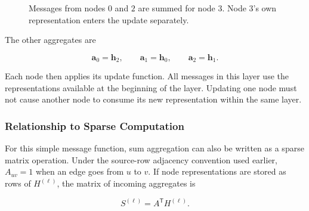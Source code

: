 \begin{figure}[H]
  \centering
  \caption{Messages from nodes $0$ and $2$ are summed for node $3$. Node $3$'s own representation enters the update separately.}
  \label{fig:message-passing-example}
\end{figure}

The other aggregates are

\[
  \mathbf{a}_0=\mathbf{h}_2,
  \qquad
  \mathbf{a}_1=\mathbf{h}_0,
  \qquad
  \mathbf{a}_2=\mathbf{h}_1.
\]

Each node then applies its update function. All messages in this layer use the representations available at the beginning of the layer. Updating one node must not cause another node to consume its new representation within the same layer.

\subsubsection{Relationship to Sparse Computation}

For this simple message function, sum aggregation can also be written as a sparse matrix operation. Under the source-row adjacency convention used earlier, $A_{uv}=1$ when an edge goes from $u$ to $v$. If node representations are stored as rows of $H^{(\ell)}$, the matrix of incoming aggregates is

\[
  S^{(\ell)}=A^{\mathsf{T}}H^{(\ell)}.
\]

